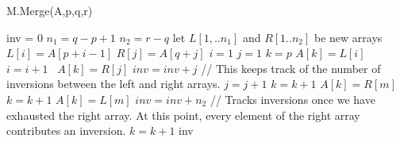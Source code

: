\documentclass{article}
\begin{document}
\begin{enumerate}[a.]
\begin{algorithm}
\caption{M.Merge(A,p,q,r)}
\begin{algorithmic}
\State inv = 0
\State $n_1 = q-p+1$
\State $n_2 = r-q$
\State let $L[1,..n_1]$ and $R[1..n_2]$ be new arrays
	\State $L[i] = A[p+i-1]$
\EndFor
{}
	\State $R[j] = A[q+j]$
\EndFor
\State $i=1$
\State $j=1$
\State $k=p$
		\State $A[k] = L[i]$
		\State $i = i+1$
	\Else  $\,\,\,A[k] = R[j]$
		\State $inv = inv + j$ // This keeps track of the number of inversions between the left and right arrays.
		\State $j = j+1$
	\EndIf
\State $k = k + 1$
\EndWhile
{}
		\State $A[k] = R[m]$
		\State $k = k + 1$	
	\EndFor
\EndIf
{}
		\State $A[k] = L[m]$
		\State $inv = inv + n_2$ // Tracks inversions once we have exhausted the right array.  At this point, every element of the right array contributes an inversion.
		\State $k = k + 1$
	\EndFor
\EndIf
\State \Return inv
\end{algorithmic}
\end{algorithm}

\end{enumerate}
\end{document}
